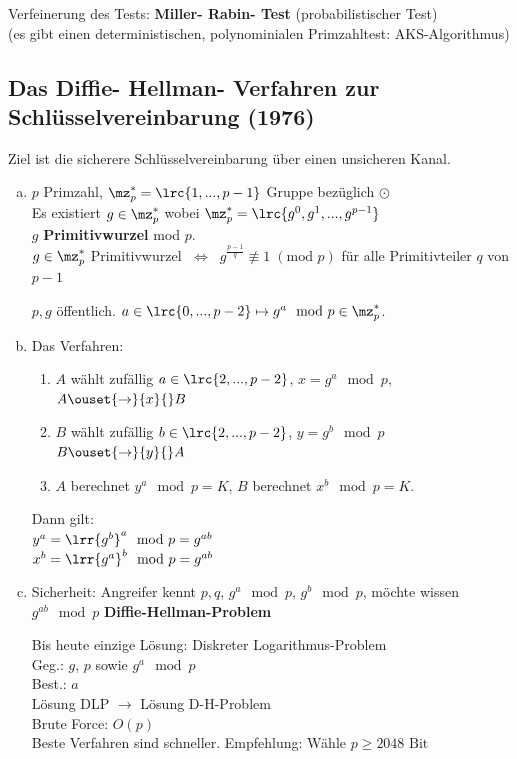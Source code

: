 		Verfeinerung des Tests: \textbf{Miller- Rabin- Test} (probabilistischer Test)\\
		(es gibt einen deterministischen, polynominialen Primzahltest: AKS-Algorithmus)
\newpage
	\subsection{Das Diffie- Hellman- Verfahren zur Schlüsselvereinbarung (1976)}
		Ziel ist die sicherere Schlüsselvereinbarung über einen unsicheren Kanal.
		\begin{enumerate}[a)]
			\item $p$ Primzahl, $\mz_p^*=\lrc{1,...,p-1}$ Gruppe bezüglich $\odot$\\
				Es existiert $g\in\mz_p^*$ wobei $\mz_p^*=\lrc{g^0,g^1,...,g^{p-1}}$\\
				$g$ \textbf{Primitivwurzel} mod $p$.\\
				$g\in\mz_p^*$ Primitivwurzel $\;\Leftrightarrow\;\; g^{\frac{p-1}{q}}\not\equiv 1\; (\mbox{mod } p)$ für alle Primitivteiler $q$ von $p-1$

				$p,g$ öffentlich. $a\in\lrc{0,...,p-2}\mapsto g^a\mod p\in\mz_p^*$.
			\item Das Verfahren:
				\begin{enumerate}[1.]
					\item $A$ wählt zufällig $a\in\lrc{2,...,p-2}$, $x=g^a\mod p$, $A\ouset{\rightarrow}{x}{} B$
					\item $B$ wählt zufällig $b\in\lrc{2,...,p-2}$, $y=g^b\mod p$
						$B\ouset{\rightarrow}{y}{} A$
					\item $A$ berechnet $y^a\mod p=K$, $B$ berechnet $x^b\mod p=K$.
				\end{enumerate}

				Dann gilt:\\
				$y^a=\lrr{g^b}^a\mod p=g^{ab}$\\
				$x^b=\lrr{g^a}^b\mod p=g^{ab}$
			\item Sicherheit: Angreifer kennt $p,q$, $g^a\mod p$, $g^b\mod p$, möchte wissen $g^{ab}\mod p$ \textbf{Diffie-Hellman-Problem}

				Bis heute einzige Lösung: Diskreter Logarithmus-Problem\\
				Geg.: $g$, $p$ sowie $g^a\mod p$\\
				Best.: $a$\\
				Lösung DLP $\rightarrow$ Lösung D-H-Problem\\
				Brute Force: $O(p)$\\
				Beste Verfahren sind schneller. Empfehlung: Wähle $p\geq 2048\mbox{ Bit}$
		\end{enumerate}
\newpage
